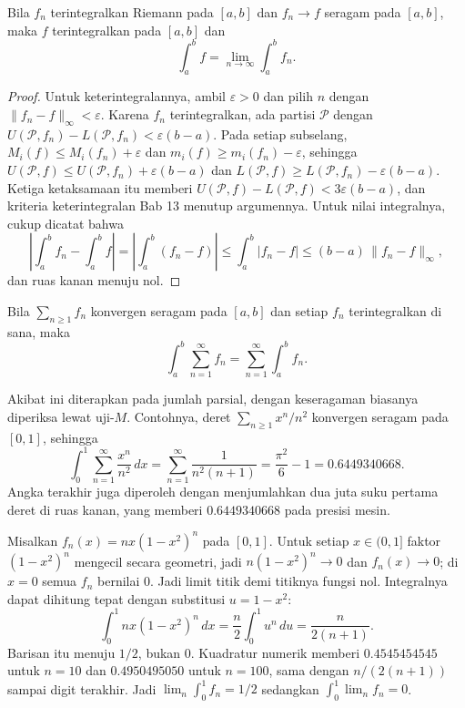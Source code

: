 \begin{teorema}
Bila $f_n$ terintegralkan Riemann pada $[a,b]$ dan $f_n\to f$ seragam pada
$[a,b]$, maka $f$ terintegralkan pada $[a,b]$ dan
\[
  \int_a^b f=\lim_{n\to\infty}\int_a^b f_n .
\]
\end{teorema}

\begin{proof}
Untuk keterintegralannya, ambil $\varepsilon>0$ dan pilih $n$ dengan
$\|f_n-f\|_\infty<\varepsilon$. Karena $f_n$ terintegralkan, ada partisi
$\mathcal{P}$ dengan $U(\mathcal{P},f_n)-L(\mathcal{P},f_n)<\varepsilon(b-a)$.
Pada setiap subselang, $M_i(f)\le M_i(f_n)+\varepsilon$ dan
$m_i(f)\ge m_i(f_n)-\varepsilon$, sehingga
$U(\mathcal{P},f)\le U(\mathcal{P},f_n)+\varepsilon(b-a)$ dan
$L(\mathcal{P},f)\ge L(\mathcal{P},f_n)-\varepsilon(b-a)$. Ketiga ketaksamaan
itu memberi $U(\mathcal{P},f)-L(\mathcal{P},f)<3\varepsilon(b-a)$, dan kriteria
keterintegralan Bab 13 menutup argumennya. Untuk nilai integralnya, cukup
dicatat bahwa
\[
  \left|\int_a^b f_n-\int_a^b f\right|
  =\left|\int_a^b (f_n-f)\right|
  \le\int_a^b|f_n-f|\le(b-a)\,\|f_n-f\|_\infty ,
\]
dan ruas kanan menuju nol.
\end{proof}

\begin{akibat}
Bila $\sum_{n\ge1}f_n$ konvergen seragam pada $[a,b]$ dan setiap $f_n$
terintegralkan di sana, maka
\[
  \int_a^b\sum_{n=1}^{\infty}f_n=\sum_{n=1}^{\infty}\int_a^b f_n .
\]
\end{akibat}

Akibat ini diterapkan pada jumlah parsial, dengan keseragaman biasanya
diperiksa lewat uji-$M$. Contohnya, deret $\sum_{n\ge1}x^n/n^2$ konvergen seragam
pada $[0,1]$, sehingga
\[
  \int_0^1\sum_{n=1}^{\infty}\frac{x^n}{n^2}\,dx
  =\sum_{n=1}^{\infty}\frac{1}{n^2(n+1)}=\frac{\pi^2}{6}-1=0.6449340668 .
\]
Angka terakhir juga diperoleh dengan menjumlahkan dua juta suku pertama deret di
ruas kanan, yang memberi $0.6449340668$ pada presisi mesin.

\begin{contoh}
Misalkan $f_n(x)=nx(1-x^2)^n$ pada $[0,1]$. Untuk setiap $x\in(0,1]$ faktor
$(1-x^2)^n$ mengecil secara geometri, jadi $n(1-x^2)^n\to0$ dan $f_n(x)\to0$;
di $x=0$ semua $f_n$ bernilai $0$. Jadi limit titik demi titiknya fungsi nol.
Integralnya dapat dihitung tepat dengan substitusi $u=1-x^2$:
\[
  \int_0^1 nx(1-x^2)^n\,dx=\frac{n}{2}\int_0^1 u^n\,du=\frac{n}{2(n+1)} .
\]
Barisan itu menuju $1/2$, bukan $0$. Kuadratur numerik memberi
$0.4545454545$ untuk $n=10$ dan $0.4950495050$ untuk $n=100$, sama dengan
$n/(2(n+1))$ sampai digit terakhir. Jadi $\lim_n\int_0^1f_n=1/2$ sedangkan
$\int_0^1\lim_nf_n=0$.
\end{contoh}

